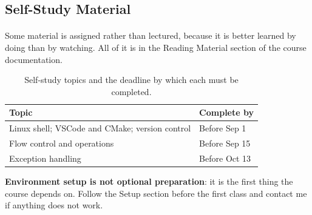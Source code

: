 \documentclass[
    10pt,
    dvipsnames,
    svgnames,
    x11names,
    aspectratio=1610,
    english,
    codeminted]{beamer}
\begin{document}
\subsection*{Self-Study Material}
\begingroup
\divframetrue
\renewcommand{\divbartextA}{\secname}
\renewcommand{\divbartextB}{}
\begin{frame}{\secname}
  \divbar{\secname}{\subsecname}
  \framesubtitle{\subsecname}

Some material is assigned rather than lectured, because it is better learned by doing than by watching. All of it is in the Reading Material section of the course documentation.

\begin{table}[h]
\caption{Self-study topics and the deadline by which each must be completed.}
\footnotesize\centering
\renewcommand{\arraystretch}{1.2}
\begin{tabular}{m{6.5cm}m{3.2cm}}
  \toprule
  \textbf{Topic} & \textbf{Complete by} \\
  \midrule
  Linux shell; VSCode and CMake; version control & Before Sep 1 \\
  Flow control and operations                    & Before Sep 15 \\
  Exception handling                             & Before Oct 13 \\
  \bottomrule
\end{tabular}
\end{table}

\medskip
\begin{MyBox}
\textbf{Environment setup is not optional preparation}: it is the first thing the course depends on. Follow the Setup section before the first class and contact me if anything does not work.
\end{MyBox}
\end{frame}
\endgroup


\end{document}
